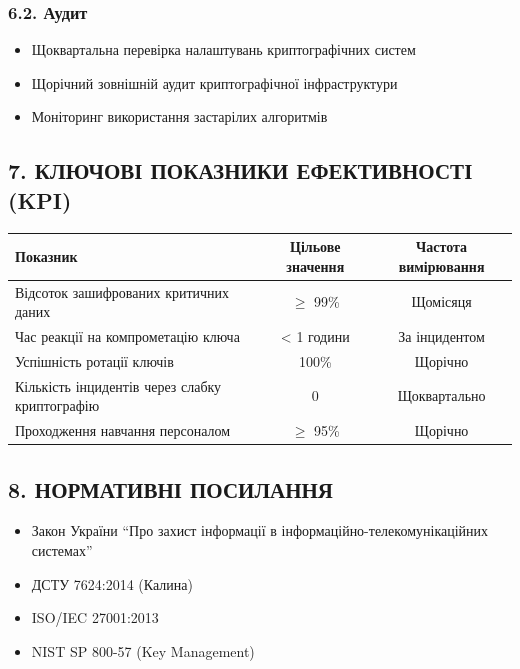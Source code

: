 \subsubsection*{6.2. Аудит}
\begin{itemize}
    \item Щоквартальна перевірка налаштувань криптографічних систем
    \item Щорічний зовнішній аудит криптографічної інфраструктури
    \item Моніторинг використання застарілих алгоритмів
\end{itemize}

\subsection*{7. КЛЮЧОВІ ПОКАЗНИКИ ЕФЕКТИВНОСТІ (KPI)}

\begin{table}[h]
\centering
\begin{tabular}{|p{6cm}|c|c|}
\hline
\textbf{Показник} & \textbf{Цільове значення} & \textbf{Частота вимірювання} \\
\hline
Відсоток зашифрованих критичних даних & $\geq$ 99\% & Щомісяця \\
\hline
Час реакції на компрометацію ключа & < 1 години & За інцидентом \\
\hline
Успішність ротації ключів & 100\% & Щорічно \\
\hline
Кількість інцидентів через слабку криптографію & 0 & Щоквартально \\
\hline
Проходження навчання персоналом & $\geq$ 95\% & Щорічно \\
\hline
\end{tabular}
\end{table}

\subsection*{8. НОРМАТИВНІ ПОСИЛАННЯ}

\begin{itemize}
    \item Закон України ``Про захист інформації в інформаційно-телекомунікаційних системах''
    \item ДСТУ 7624:2014 (Калина)
    \item ISO/IEC 27001:2013
    \item NIST SP 800-57 (Key Management)
\end{itemize}